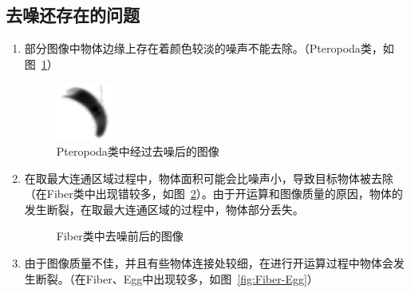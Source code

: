 \documentclass[12pt]{article}
\begin{document}
\subsection{去噪还存在的问题}
\begin{enumerate}
    \item 部分图像中物体边缘上存在着颜色较淡的噪声不能去除。（Pteropoda类，如图~\ref{fig:Pteropoda}）
    \begin{figure}[!ht]
        \centering
        \includegraphics[width=0.2\linewidth]{Pteropoda_jb19820512_1_510}
        \caption{Pteropoda类中经过去噪后的图像}
        \label{fig:Pteropoda}
    \end{figure}
    \item 在取最大连通区域过程中，物体面积可能会比噪声小，导致目标物体被去除（在Fiber类中出现错较多，如图~\ref{fig:Fiber}）。由于开运算和图像质量的原因，物体的发生断裂，在取最大连通区域的过程中，物体部分丢失。
    \begin{figure}[!ht]
        \centering
        \caption{Fiber类中去噪前后的图像}
        \label{fig:Fiber}
    \end{figure}
    \item 由于图像质量不佳，并且有些物体连接处较细，在进行开运算过程中物体会发生断裂。（在Fiber、Egg中出现较多，如图~\ref{fig:Fiber-Egg}）
        \begin{figure}[!ht]
        \centering
        \subfigure[Fiber类去噪后的图像]{
}
\end{figure}
\end{enumerate}
\end{document}
